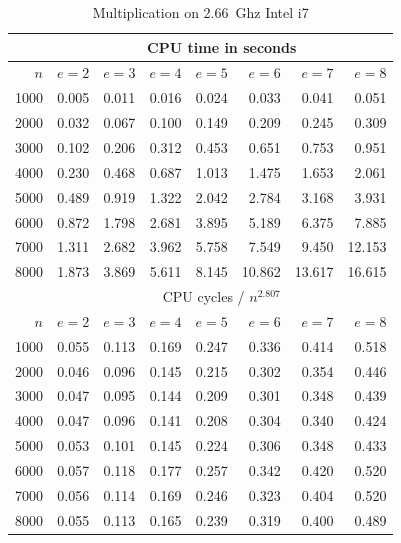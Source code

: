 \documentclass[11pt]{beamer}
\newcommand{\mycomputer}{2.66~Ghz Intel i7\xspace}
\begin{document}
\begin{frame}[allowframebreaks]
\begin{table}
\centering
\begin{scriptsize}
\begin{tabular}{|r||r|r|r|r|r|r|r|}
\hline
     & \multicolumn{7}{|c|}{CPU time in seconds}\\
\hline
$n$  & $e=2$ & $e=3$ & $e=4$ & $e=5$ & $e=6$ & $e=7$ & $e=8$\\
\hline
 1000 & 0.005 & 0.011 &  0.016 &  0.024 &  0.033 &  0.041 &  0.051\\
 2000 & 0.032 & 0.067 &  0.100 &  0.149 &  0.209 &  0.245 &  0.309\\
 3000 & 0.102 & 0.206 &  0.312 &  0.453 &  0.651 &  0.753 &  0.951\\
 4000 & 0.230 & 0.468 &  0.687 &  1.013 &  1.475 &  1.653 &  2.061\\
 5000 & 0.489 & 0.919 &  1.322 &  2.042 &  2.784 &  3.168 &  3.931\\
 6000 & 0.872 & 1.798 &  2.681 &  3.895 &  5.189 &  6.375 &  7.885\\
 7000 & 1.311 & 2.682 &  3.962 &  5.758 &  7.549 &  9.450 & 12.153\\
 8000 & 1.873 & 3.869 &  5.611 &  8.145 & 10.862 & 13.617 & 16.615\\
\hline
\hline
     & \multicolumn{7}{|c|}{CPU cycles / $n^{2.807}$}\\
\hline
$n$  & $e=2$ & $e=3$ & $e=4$ & $e=5$ & $e=6$ & $e=7$ & $e=8$\\
\hline
 1000 & 0.055 & 0.113 & 0.169 & 0.247 & 0.336 & 0.414 & 0.518\\
 2000 & 0.046 & 0.096 & 0.145 & 0.215 & 0.302 & 0.354 & 0.446\\
 3000 & 0.047 & 0.095 & 0.144 & 0.209 & 0.301 & 0.348 & 0.439\\
 4000 & 0.047 & 0.096 & 0.141 & 0.208 & 0.304 & 0.340 & 0.424\\
 5000 & 0.053 & 0.101 & 0.145 & 0.224 & 0.306 & 0.348 & 0.433\\
 6000 & 0.057 & 0.118 & 0.177 & 0.257 & 0.342 & 0.420 & 0.520\\
 7000 & 0.056 & 0.114 & 0.169 & 0.246 & 0.323 & 0.404 & 0.520\\
 8000 & 0.055 & 0.113 & 0.165 & 0.239 & 0.319 & 0.400 & 0.489\\
\hline
\end{tabular}
\end{scriptsize}
\caption{Multiplication on \mycomputer}
\label{tab:moremul}
\end{table}


\end{frame}
\end{document}
